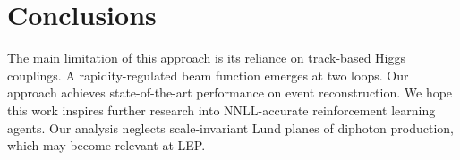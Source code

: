 \section{Conclusions}\label{sec:conclusions}

The main limitation of this approach is its reliance on track-based
Higgs couplings. A rapidity-regulated beam function emerges at two
loops. Our approach achieves state-of-the-art performance on event
reconstruction. We hope this work inspires further research into
NNLL-accurate reinforcement learning agents. Our analysis neglects
scale-invariant Lund planes of diphoton production, which may become
relevant at LEP.

